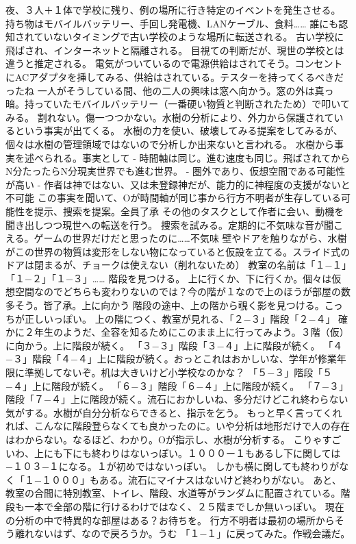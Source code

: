 \documentclass[uplatex]{utbook}
\begin{document}
夜、３人＋１体で学校に残り、例の場所に行き特定のイベントを発生させる。
持ち物はモバイルバッテリー、手回し発電機、LANケーブル、食料……
誰にも認知されていないタイミングで古い学校のような場所に転送される。
古い学校に飛ばされ、インターネットと隔離される。
目視ての判断だが、現世の学校とは違うと推定される。
電気がついているので電源供給はされてそう。コンセントにACアダプタを挿してみる、供給はされている。テスターを持ってくるべきだったね
一人がそうしている間、他の二人の興味は窓へ向かう。窓の外は真っ暗。持っていたモバイルバッテリー（一番硬い物質と判断されたため）で叩いてみる。
割れない。傷一つつかない。水樹の分析により、外力から保護されているという事実が出てくる。
水樹の力を使い、破壊してみる提案をしてみるが、個々は水樹の管理領域ではないので分析しか出来ないと言われる。
水樹から事実を述べられる。事実として
- 時間軸は同じ。進む速度も同じ。飛ばされてからN分たったらN分現実世界でも進む世界。
- 圏外であり、仮想空間である可能性が高い
- 作者は神ではない、又は未登録神だが、能力的に神程度の支援がないと不可能
この事実を聞いて、Oが時間軸が同じ事から行方不明者が生存している可能性を提示、捜索を提案。全員了承
その他のタスクとして作者に会い、動機を聞き出しつつ現世への転送を行う。
捜索を試みる。定期的に不気味な音が聞こえる。ゲームの世界だけだと思ったのに……不気味
壁やドアを触りながら、水樹がこの世界の物質は変形をしない物になっていると仮設を立てる。スライド式のドアは閉まるが、チョークは使えない（削れないため）
教室の名前は「１−１」「１−２」「１−３」……
階段を見つける。
上に行くか、下に行くか。個々は仮想空間なのでどちらも変わりないのでは？今の階が１なので上のほうが部屋の数多そう。皆了承。上に向かう
階段の途中、上の階から覗く影を見つける。こっちが正しいっぽい。
上の階につく、教室が見れる、「２−３」階段「２−４」
確かに２年生のようだ、全容を知るためにこのまま上に行ってみよう。３階（仮）に向かう。上に階段が続く。
「３−３」階段「３−４」上に階段が続く。
「４−３」階段「４−４」上に階段が続く。おっとこれはおかしいな、学年が修業年限に準拠してないぞ。机は大きいけど小学校なのかな？
「５−３」階段「５−４」上に階段が続く。
「６−３」階段「６−４」上に階段が続く。
「７−３」階段「７−４」上に階段が続く。流石におかしいね、多分だけどこれ終わらない気がする。水樹が自分分析ならできると、指示を乞う。
もっと早く言ってくれれば、こんなに階段登らなくても良かったのに。いや分析は地形だけで人の存在はわからない。なるほど、わかり。Oが指示し、水樹が分析する。
こりゃすごいわ、上にも下にも終わりはないっぽい。１０００ー１もあるし下に関しては−１０３−１になる。１が初めではないっぽい。
しかも横に関しても終わりがなく「１−１０００」もある。流石にマイナスはないけど終わりがない。
あと、教室の合間に特別教室、トイレ、階段、水道等がランダムに配置されている。階段も一本で全部の階に行けるわけではなく、２５階までしか無いっぽい。
現在の分析の中で特異的な部屋はある？お待ちを。
行方不明者は最初の場所からそう離れないはず、なので戻ろうか。うむ
「１−１」に戻ってみた。作戦会議だ。
\end{document}
